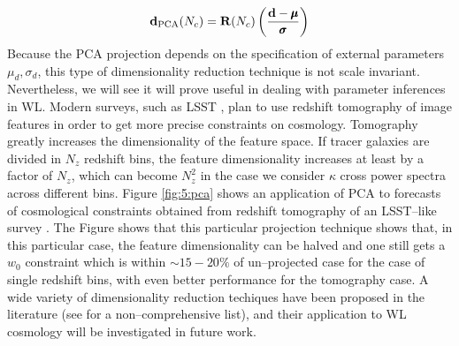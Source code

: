 \begin{equation}
\label{eq:5:pca-projection}
\mathbf{d}_{\rm PCA}(N_c) = \mathbf{R}(N_c)\left(\frac{\mathbf{d}-\pmb{\mu}}{\pmb{\sigma}}\right)
\end{equation}
%
Because the PCA projection depends on the specification of external parameters $\mu_d,\sigma_d$, this type of dimensionality reduction technique is not scale invariant. Nevertheless, we will see it will prove useful in dealing with parameter inferences in WL. Modern surveys, such as LSST \citep{LSST}, plan to use redshift tomography of image features in order to get more precise constraints on cosmology. Tomography greatly increases the dimensionality of the feature space. If tracer galaxies are divided in $N_z$ redshift bins, the feature dimensionality increases at least by a factor of $N_z$, which can become $N_z^2$ in the case we consider $\kappa$ cross power spectra across different bins. Figure \ref{fig:5:pca} shows an application of PCA to forecasts of cosmological constraints obtained from redshift tomography of an LSST--like survey \citep{PetriPhotoZ}. The Figure shows that this particular projection technique shows that, in this particular case, the feature dimensionality can be halved and one still gets a $w_0$ constraint which is within $\sim 15-20\%$ of un--projected case for the case of single redshift bins, with even better performance for the tomography case. A wide variety of dimensionality reduction techiques have been proposed in the literature (see \citep{astroMLText} for a non--comprehensive list), and their application to WL cosmology will be investigated in future work.      

